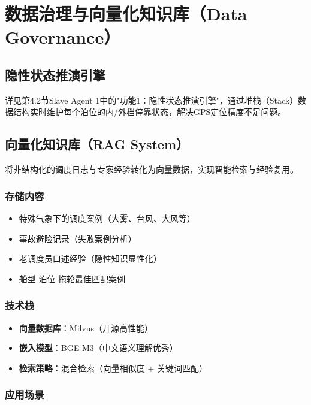 \documentclass[12pt,a4paper]{article}
\begin{document}
\section{数据治理与向量化知识库（Data Governance）}

\subsection{隐性状态推演引擎}

详见第4.2节Slave Agent 1中的"功能1：隐性状态推演引擎"，通过堆栈（Stack）数据结构实时维护每个泊位的内/外档停靠状态，解决GPS定位精度不足问题。

\subsection{向量化知识库（RAG System）}

将非结构化的调度日志与专家经验转化为向量数据，实现智能检索与经验复用。

\subsubsection{存储内容}

\begin{itemize}[leftmargin=*]
    \item 特殊气象下的调度案例（大雾、台风、大风等）
    \item 事故避险记录（失败案例分析）
    \item 老调度员口述经验（隐性知识显性化）
    \item 船型-泊位-拖轮最佳匹配案例
\end{itemize}

\subsubsection{技术栈}

\begin{itemize}[leftmargin=*]
    \item \textbf{向量数据库}：Milvus（开源高性能）
    \item \textbf{嵌入模型}：BGE-M3（中文语义理解优秀）
    \item \textbf{检索策略}：混合检索（向量相似度 + 关键词匹配）
\end{itemize}

\subsubsection{应用场景}
\end{document}
